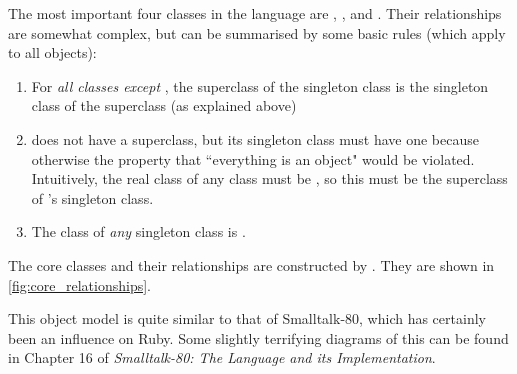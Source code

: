 The most important four classes in the language are , ,  and . Their relationships are somewhat complex, but can be summarised by some basic rules (which apply to all objects):

\begin{enumerate}
  \item For \textit{all classes except }, the superclass of the singleton class is the singleton class of the superclass (as explained above)
  \item {} does not have a superclass, but its singleton class must have one because otherwise the property that ``everything is an object" would be violated. Intuitively, the real class of any class must be , so this must be the superclass of 's singleton class.
  \item The class of \textit{any} singleton class is .
\end{enumerate}

The core classes and their relationships are constructed by . They are shown in \autoref{fig:core_relationships}.

This object model is quite similar to that of Smalltalk-80, which has certainly been an influence on Ruby. Some slightly terrifying diagrams of this can be found in Chapter 16 of \textit{Smalltalk-80: The Language and its Implementation}.


